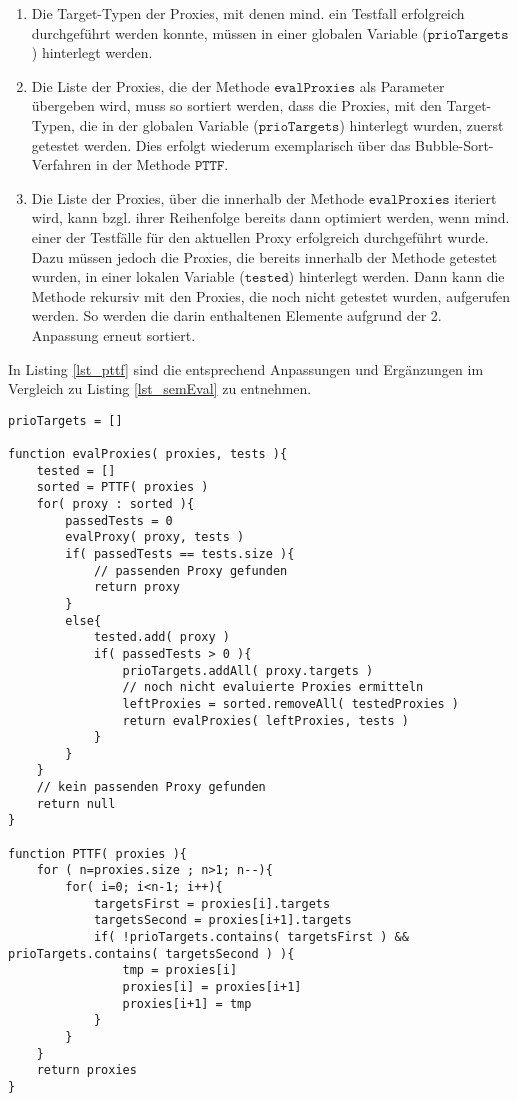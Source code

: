 \begin{enumerate}
\item Die Target-Typen der Proxies, mit denen mind. ein Testfall erfolgreich durchgeführt werden konnte, müssen in einer globalen Variable ($\texttt{prioTargets}$) hinterlegt werden.

\item Die Liste der Proxies, die der Methode $\texttt{evalProxies}$ als Parameter übergeben wird, muss so sortiert werden, dass die Proxies, mit den Target-Typen, die in der globalen Variable ($\texttt{prioTargets}$) hinterlegt wurden, zuerst getestet werden. Dies erfolgt wiederum exemplarisch über das Bubble-Sort-Verfahren in der Methode $\texttt{PTTF}$.

\item Die Liste der Proxies, über die innerhalb der Methode $\texttt{evalProxies}$ iteriert wird, kann bzgl. ihrer Reihenfolge bereits dann optimiert werden, wenn mind. einer der Testfälle für den aktuellen Proxy erfolgreich durchgeführt wurde. Dazu müssen jedoch die Proxies, die bereits innerhalb der Methode getestet wurden, in einer lokalen Variable ($\texttt{tested}$) hinterlegt werden. Dann kann die Methode rekursiv mit den Proxies, die noch nicht getestet wurden, aufgerufen werden. So werden die darin enthaltenen Elemente aufgrund der 2. Anpassung erneut sortiert.
\end{enumerate}  
In Listing \ref{lst_pttf} sind die entsprechend Anpassungen und Ergänzungen im Vergleich zu Listing \ref{lst_semEval} zu entnehmen.
\begin{lstlisting}[style = pseudo, caption = Semantische Evaluation mit Heuristik PTTF, captionpos = b, label = lst_pttf]
prioTargets = []

function evalProxies( proxies, tests ){
	tested = []
	sorted = PTTF( proxies )
	for( proxy : sorted ){
		passedTests = 0
		evalProxy( proxy, tests )
		if( passedTests == tests.size ){
			// passenden Proxy gefunden
			return proxy
		}
		else{
			tested.add( proxy )
			if( passedTests > 0 ){
				prioTargets.addAll( proxy.targets )
				// noch nicht evaluierte Proxies ermitteln
				leftProxies = sorted.removeAll( testedProxies )
				return evalProxies( leftProxies, tests )
			}
		}
	}
	// kein passenden Proxy gefunden
	return null
}

function PTTF( proxies ){
	for	( n=proxies.size ; n>1; n--){
		for( i=0; i<n-1; i++){
			targetsFirst = proxies[i].targets
			targetsSecond = proxies[i+1].targets			
			if( !prioTargets.contains( targetsFirst ) && prioTargets.contains( targetsSecond ) ){
				tmp = proxies[i]
				proxies[i] = proxies[i+1]
				proxies[i+1] = tmp
			}
		}
	}
	return proxies	
}
\end{lstlisting}

